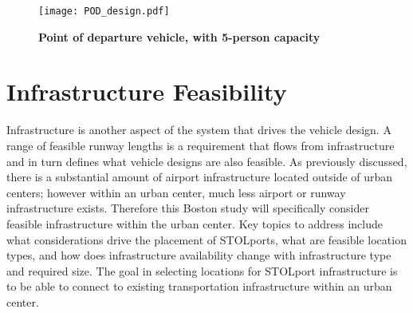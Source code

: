 \documentclass[]{aiaa-tc}%
\begin{document}
\begin{figure}[h!]
 
     \texttt{[image: POD\_design.pdf]}
 
    \caption{\textbf{Point of departure vehicle, with 5-person capacity}}
 \label{f:vehicle}
 \end{figure}

\section{Infrastructure Feasibility}
Infrastructure is another aspect of the system that drives the vehicle design. A range of feasible runway lengths is a requirement that flows from infrastructure and in turn defines what vehicle designs are also feasible. As previously discussed, there is a substantial amount of airport infrastructure located outside of urban centers; however within an urban center, much less airport or runway infrastructure exists. Therefore this Boston study will specifically consider feasible infrastructure within the urban center.  Key topics to address include what considerations drive the placement of STOLports, what are feasible location types, and how does infrastructure availability change with infrastructure type and required size. The goal in selecting locations for STOLport infrastructure is to be able to connect to existing transportation infrastructure within an urban center.
\end{document}

